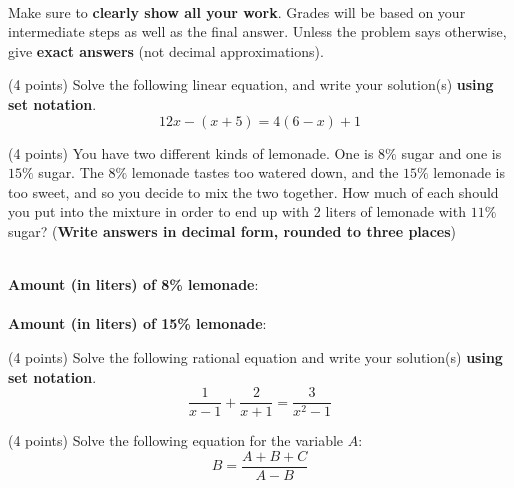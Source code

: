 \documentclass {article}
\newenvironment{prob}[2][]{\begin{trivlist}
\item[\hskip \labelsep {\bfseries #1}\hskip \labelsep {\bfseries #2.}]}{\end{trivlist}}
\newcommand{\softreturn}{\ \\ \relax}
\begin{document}
\softreturn
Make sure to \textbf{clearly show all your work}. Grades will be based on your intermediate steps
as well as the final answer. Unless the problem says otherwise, give \textbf{exact answers} (not decimal approximations).

\vspace {1cm}

\begin {prob}{1} (4 points)
    Solve the following linear equation, and write your solution(s) \textbf{using set notation}.
    \[ 12x - (x+5) = 4(6-x) + 1 \]
\end {prob}

\vspace {6cm}

\begin {prob}{2} (4 points)
    You have two different kinds of lemonade. One is $8\%$ sugar and one is $15\%$ sugar.
    The $8\%$ lemonade tastes too watered down, and the $15\%$ lemonade is too sweet, and so you 
    decide to mix the two together. How much of each should you put into the mixture in order to
    end up with 2 liters of lemonade with $11\%$ sugar? (\textbf{Write answers in decimal form, rounded to three places})
\end {prob}

\vspace {6cm}

\softreturn
\textbf{Amount (in liters) of 8\% lemonade}: \underline{\hspace{6cm}} \\ \\
\textbf{Amount (in liters) of 15\% lemonade}: \underline{\hspace{6cm}}

\newpage

\begin {prob}{3} (4 points)
    Solve the following rational equation and write your solution(s) \textbf{using set notation}.
    \[ \frac{1}{x-1} + \frac{2}{x+1} = \frac{3}{x^2-1} \]
\end {prob}

\vspace {6cm}

\begin {prob}{4} (4 points)
    Solve the following equation for the variable $A$:
    \[ B = \frac{A+B+C}{A-B} \]
\end {prob}

\vspace {6cm}
\end{document}
